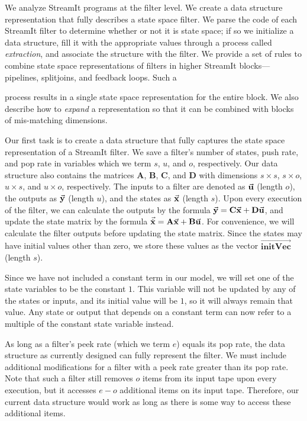 \label{sec:statespace}

We analyze StreamIt programs at the filter level. We create a data
structure representation that fully describes a state space filter. We
parse the code of each StreamIt filter to determine whether or not it
is state space; if so we initialize a data structure, fill it with the
appropriate values through a process called \emph{extraction}, and
associate the structure with the filter. We provide a set of rules to
combine state space representations of filters in higher StreamIt
blocks---pipelines, splitjoins, and feedback loops. Such a 
\clearpage

\noindent process results in a single state space representation for 
the entire block. We also describe how to \emph{expand} a
representation so that it can be combined with blocks of mis-matching
dimensions.


Our first task is to create a data structure that fully captures the
state space representation of a StreamIt filter.  We save a 
filter's number of states, push rate, and pop rate in variables which
we term $s$, $u$, and $o$, respectively. Our data structure also
contains the matrices $\mathbf{A}$, $\mathbf{B}$, $\mathbf{C}$, and
$\mathbf{D}$ with dimensions $s \times s$, $s
\times o$, $u \times s$, and $u \times o$, respectively. The
inputs to a filter are denoted as $\vec{\mathbf{u}}$ (length $o$), the
outputs as $\vec{\mathbf{y}}$ (length $u$), and the states as
$\vec{\mathbf{x}}$ (length $s$). Upon every execution of the filter,
we can calculate the outputs by the formula $\vec{\mathbf{y}} =
\mathbf{C}\vec{\mathbf{x}} +
\mathbf{D}\vec{\mathbf{u}}$, and update the state matrix by the
formula $\vec{\dot{\mathbf{x}}} = \mathbf{A}\vec{\mathbf{x}} +
\mathbf{B}\vec{\mathbf{u}}$. For convenience, we will calculate
the filter outputs before updating the state matrix. Since the
states may have initial values other than zero, we store these
values as the vector $\overrightarrow{\mathbf{initVec}}$ (length
$s$).

Since we have not included a constant term in our model, we will set
one of the state variables to be the constant $1$. This variable will
not be updated by any of the states or inputs, and its initial value
will be $1$, so it will always remain that value. Any state or output
that depends on a constant term can now refer to a multiple of the
constant state variable instead.

As long as a filter's peek rate (which we term $e$) equals its pop
rate, the data structure as currently designed can fully represent the
filter. We must include additional modifications for a filter with a
peek rate greater than its pop rate. Note that such a filter still
removes $o$ items from its input tape upon every execution, but it
accesses $e-o$ additional items on its input tape. Therefore, our
current data structure would work as long as there is some way to
access these additional items.

